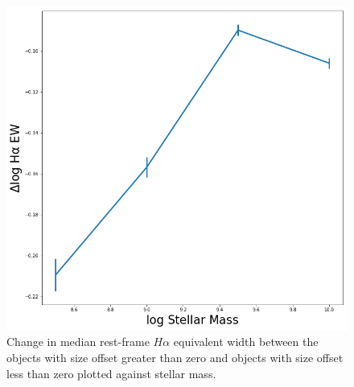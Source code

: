 \documentclass[iop]{emulateapj}
\begin{document}
\begin{figure}
	\centering
	\includegraphics[width= \columnwidth]{ratios_ha_ew.png}
	\caption{Change in median rest-frame $H\alpha$ equivalent width between the objects with size offset greater than zero and objects with size offset less than zero plotted against stellar mass.}
	\label{fig:HA_ew_mass}
	
\end{figure}
\end{document}
